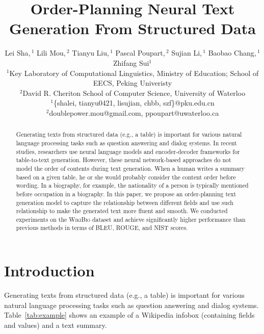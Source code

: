 \documentclass[letterpaper]{article} %
\begin{document}
%
\title{Order-Planning Neural Text Generation From Structured Data}

\author{Lei Sha,\!\!\,$^1$ Lili Mou,\!\!\,$^2$ Tianyu Liu,\!\!\,$^1$ Pascal Poupart,\!\!\,$^2$ Sujian Li,\!\!\,$^1$ Baobao Chang,\!\!\,$^1$ Zhifang Sui$^1$\\
	$^1$Key Laboratory of Computational Linguistics, Ministry of Education; School of EECS, Peking Univeristy\\
	$^2$David R. Cheriton School of Computer Science, University of Waterloo\\
	$^1$\{shalei, tianyu0421, lisujian, chbb, szf\}@pku.edu.cn\\
	$^2$doublepower.mou@gmail.com, ppoupart@uwaterloo.ca
}
\maketitle


\begin{abstract}
Generating texts from structured data (e.g., a table) is important for various natural language processing tasks such as question answering and dialog systems. In recent studies, researchers use neural language models and encoder-decoder frameworks for table-to-text generation. However, these neural network-based approaches do not model the order of contents during text generation. When a human writes a summary based on a given table, he or she would probably consider the content order before wording. In a biography, for example, the nationality of a person is typically mentioned before occupation in a biography. In this paper, we propose an order-planning text generation model to capture the relationship between different fields and use such relationship to make the generated text more fluent and smooth. We conducted experiments on the \textsc{WikiBio} dataset and achieve significantly higher performance than previous methods in terms of BLEU, ROUGE, and NIST scores.
\end{abstract}

\section{Introduction}

Generating texts from structured data (e.g., a table) is important for various natural language processing tasks such as question answering and dialog systems. Table~\ref{tab:example} shows an example of a Wikipedia infobox (containing fields and values) and a text summary.
\end{document}
